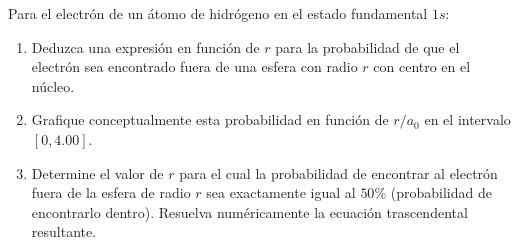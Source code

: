 \item Para el electrón de un átomo de hidrógeno en el estado fundamental $1s$:
\begin{enumerate}
    \item Deduzca una expresión en función de $r$ para la probabilidad de que el electrón sea encontrado fuera de una esfera con radio $r$ con centro en el núcleo.
    \item Grafique conceptualmente esta probabilidad en función de $r/a_0$ en el intervalo $[0, 4.00]$.
    \item Determine el valor de $r$ para el cual la probabilidad de encontrar al electrón fuera de la esfera de radio $r$ sea exactamente igual al $50\%$ (probabilidad de encontrarlo dentro). Resuelva numéricamente la ecuación trascendental resultante.
\end{enumerate}